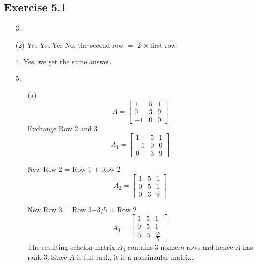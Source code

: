 \documentclass{./../../Latex/homework}
\begin{document}
\thispagestyle{plain}

\subsection*{Exercise 5.1}  
\begin{enumerate}

\item[3.] \begin{tasks}(2)
\task Yes
\task Yes
\task Yes
\task No, the second row $=$ 2 $\times$ first row. \\
\end{tasks}

\item[4.] Yes, we get the same answer. \\

\item[5.]
\begin{enumerate}
\item[(a)]  \[
A=\left[\begin{array}{ccc}
1 & 5 & 1 \\
0 & 3 & 9 \\
-1 & 0 & 0
\end{array}\right]
\]
Exchange Row 2 and 3
\[
A_{1}=\left[\begin{array}{ccc}
1 & 5 & 1 \\
-1 & 0 & 0 \\
0 & 3 & 9
\end{array}\right]
\]

New Row 2 = Row 1 $+$ Row 2
\[
A_{2}=\left[\begin{array}{lll}
1 & 5 & 1 \\
0 & 5 & 1 \\
0 & 3 & 9
\end{array}\right]
\]

New Row 3 = Row 3$-$3/5 $\times$ Row 2
\[
A_{3}=\left[\begin{array}{lll}
1 & 5 & 1 \\
0 & 5 & 1 \\
0 & 0 & \frac{42}{5}
\end{array}\right]
\]
The resulting echelon matrix $A_3$ contains 3 nonzero rows and hence $A$ has rank 3. Since $A$ is full-rank, it is a nonsingular matrix.  \\~\\


\end{enumerate}
\end{enumerate}
\end{document}
